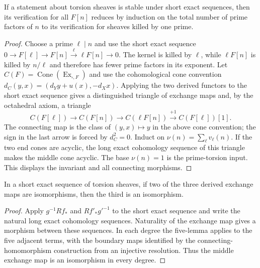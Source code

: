 \begin{lemma}
\label{lemma:weil-pbc-prime-factor-induction}
\uses{}
If a statement about torsion sheaves is stable under short exact sequences,
then its verification for all $F[n]$ reduces by induction on the total number
of prime factors of $n$ to its verification for sheaves killed by one prime.
\end{lemma}
\begin{proof}
Choose a prime $\ell\mid n$ and use the short exact sequence
$0\to F[\ell]\to F[n]\xrightarrow{\ell}\ell F[n]\to0$.
The kernel is killed by $\ell$, while $\ell F[n]$ is killed by $n/\ell$ and
therefore has fewer prime factors in its exponent.  Let
$C(F)=\operatorname{Cone}(\operatorname{Ex}_{\square,F})$ and use the
cohomological cone convention
$d_{C}(y,x)=(d_Yy+u(x),-d_Xx)$.  Applying the two derived functors to the
short exact sequence gives a distinguished triangle of exchange maps and,
by the octahedral axiom, a triangle
\[
 C(F[\ell])\longrightarrow C(F[n])\longrightarrow
 C(\ell F[n])\xrightarrow{+1}C(F[\ell])[1].
\]
The connecting map is the class of $(y,x)\mapsto y$ in the above cone
convention; the sign in the last arrow is forced by
$d_C^2=0$.  Induct on
$\nu(n)=\sum_\ell v_\ell(n)$.  If the two end cones are acyclic, the long
exact cohomology sequence of this triangle makes the middle cone acyclic.
The base $\nu(n)=1$ is the prime-torsion input.  This displays the invariant
and all connecting morphisms.
\end{proof}

\begin{lemma}
\label{lemma:weil-pbc-five-lemma-transfer}
In a short exact sequence of torsion sheaves, if two of the three derived
exchange maps are isomorphisms, then the third is an isomorphism.
\end{lemma}
\begin{proof}

Apply $g^{-1}Rf_*$ and $Rf'_*g'^{-1}$ to the short exact sequence and write
the natural long exact cohomology sequences.  Naturality of the exchange map
gives a morphism between these sequences.  In each degree the five-lemma
applies to the five adjacent terms, with the boundary maps identified by the
connecting-homomorphism construction from an injective resolution.  Thus the
middle exchange map is an isomorphism in every degree.
\end{proof}


